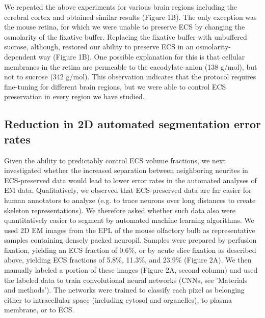 \documentclass{article}
\begin{document}
We repeated the above experiments for various brain regions including the cerebral cortex and obtained similar results (Figure 1B). The only exception was the mouse retina, for which we were unable to preserve ECS by changing the osmolarity of the fixative buffer. Replacing the fixative buffer with unbuffered sucrose, although, restored our ability to preserve ECS in an osmolarity-dependent way (Figure 1B). One possible explanation for this is that cellular membranes in the retina are permeable to the cacodylate anion (138 g/mol), but not to sucrose (342 g/mol). This observation indicates that the protocol requires fine-tuning for different brain regions, but we were able to control ECS preservation in every region we have studied.

\subsection*{Reduction in 2D automated segmentation error rates}

Given the ability to predictably control ECS volume fractions, we next investigated whether the increased separation between neighboring neurites in ECS-preserved data would lead to lower error rates in the automated analyses of EM data. Qualitatively, we observed that ECS-preserved data are far easier for human annotators to analyze (e.g. to trace neurons over long distances to create skeleton representations). We therefore asked whether such data also were quantitatively easier to segment by automated machine learning algorithms. We used 2D EM images from the EPL of the mouse olfactory bulb as representative samples containing densely packed neuropil. Samples were prepared by perfusion fixation, yielding an ECS fraction of 0.6\%, or by acute slice fixation as described above, yielding ECS fractions of 5.8\%, 11.3\%, and 23.9\% (Figure 2A). We then manually labeled a portion of these images (Figure 2A, second column) and used the labeled data to train convolutional neural networks (CNNs, see ’Materials and methods’). The networks were trained to classify each pixel as belonging either to intracellular space (including cytosol and organelles), to plasma membrane, or to ECS.
\end{document}
